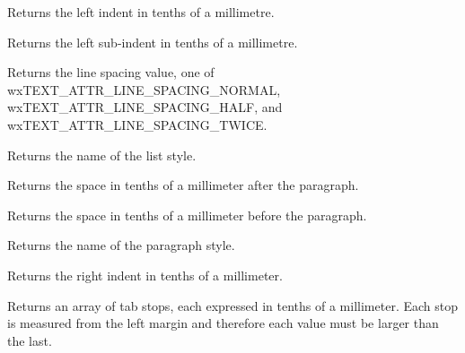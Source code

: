 Returns the left indent in tenths of a millimetre.

\label{wxrichtextattrgetleftsubindent}


Returns the left sub-indent in tenths of a millimetre.

\label{wxrichtextattrgetlinespacing}


Returns the line spacing value, one of wxTEXT\_ATTR\_LINE\_SPACING\_NORMAL,
wxTEXT\_ATTR\_LINE\_SPACING\_HALF, and wxTEXT\_ATTR\_LINE\_SPACING\_TWICE.

\label{wxrichtextattrgetliststylename}


Returns the name of the list style.

\label{wxrichtextattrgetparagraphspacingafter}


Returns the space in tenths of a millimeter after the paragraph.

\label{wxrichtextattrgetparagraphspacingbefore}


Returns the space in tenths of a millimeter before the paragraph.

\label{wxrichtextattrgetparagraphstylename}


Returns the name of the paragraph style.

\label{wxrichtextattrgetrightindent}


Returns the right indent in tenths of a millimeter.

\label{wxrichtextattrgettabs}


Returns an array of tab stops, each expressed in tenths of a millimeter. Each stop
is measured from the left margin and therefore each value must be larger than the last.

